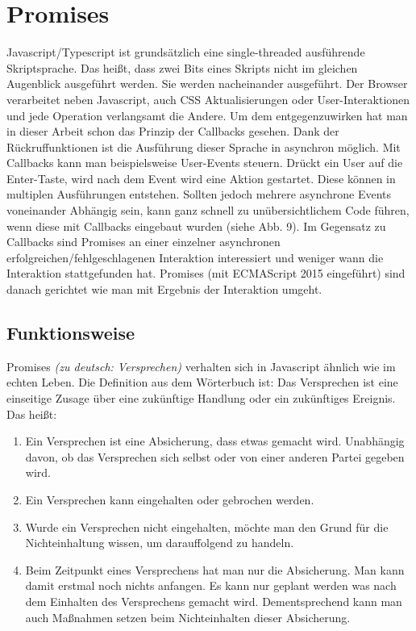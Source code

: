 \section{Promises}

Javascript/Typescript ist grundsätzlich eine single-threaded ausführende Skriptsprache. Das heißt, dass zwei Bits eines Skripts nicht im gleichen Augenblick ausgeführt werden. Sie werden nacheinander ausgeführt. Der Browser verarbeitet neben Javascript, auch CSS Aktualisierungen oder User-Interaktionen und jede Operation verlangsamt die Andere. Um dem entgegenzuwirken hat man in dieser Arbeit schon das Prinzip der Callbacks gesehen. Dank der Rückruffunktionen ist die Ausführung dieser Sprache in asynchron möglich. Mit Callbacks kann man beispielsweise User-Events steuern. Drückt ein User auf die Enter-Taste, wird nach dem Event wird eine Aktion gestartet. Diese können in multiplen Ausführungen entstehen.
Sollten jedoch mehrere asynchrone Events voneinander Abhängig sein, kann ganz schnell zu unübersichtlichem Code führen, wenn diese mit Callbacks eingebaut wurden (siehe Abb. 9). Im Gegensatz zu Callbacks sind Promises an einer einzelner asynchronen erfolgreichen/fehlgeschlagenen Interaktion interessiert und weniger wann die Interaktion stattgefunden hat. Promises (mit ECMAScript 2015 eingeführt) sind danach gerichtet wie man mit Ergebnis der Interaktion umgeht.

\subsection{Funktionsweise}

\noindent
Promises \textit{(zu deutsch: Versprechen)} verhalten sich in Javascript ähnlich wie im echten Leben. Die Definition aus dem Wörterbuch ist: Das Versprechen ist eine einseitige Zusage über eine zukünftige Handlung oder ein zukünftiges Ereignis. \cite{versprechen} \\

\noindent
Das heißt:

\begin{enumerate}
    \item Ein Versprechen ist eine Absicherung, dass etwas gemacht wird. Unabhängig davon, ob das Versprechen sich selbst oder von einer anderen Partei gegeben wird.
    
    \item Ein Versprechen kann eingehalten oder gebrochen werden.
    
    \item Wurde ein Versprechen nicht eingehalten, möchte man den Grund für die Nichteinhaltung wissen, um darauffolgend zu handeln.
    
    \item Beim Zeitpunkt eines Versprechens hat man nur die Absicherung. Man kann damit erstmal noch nichts anfangen. Es kann nur geplant werden was nach dem Einhalten des Versprechens gemacht wird. Dementsprechend kann man auch Maßnahmen setzen beim Nichteinhalten dieser Absicherung.
    
\end{enumerate}

